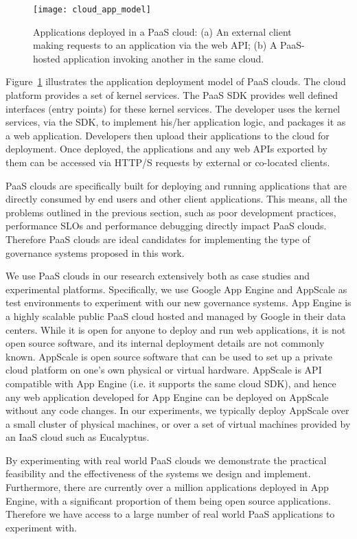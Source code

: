 \begin{figure}
\centering
\texttt{[image: cloud\_app\_model]}
\caption{Applications deployed in a PaaS cloud: (a) An external client making requests
to an application via the web API;
(b) A PaaS-hosted application invoking another in the same cloud.
\label{fig:cloud_app_model}
}
\end{figure}

Figure~\ref{fig:cloud_app_model} illustrates the application deployment model of PaaS clouds. 
The cloud platform provides a set of kernel services. 
The PaaS SDK provides well defined interfaces (entry points) for these kernel services.  
The developer uses the kernel services, via the SDK, to implement his/her application logic, and packages 
it as a web application. Developers then
upload their applications to the cloud for deployment.
Once deployed, the applications and any web APIs exported by them can be accessed 
via HTTP/S requests by external or co-located clients.

PaaS clouds are specifically built for deploying and running applications
that are directly consumed by end users and other client applications. This means, all the problems 
outlined in the previous section, such as poor development practices, performance SLOs and performance 
debugging directly impact PaaS clouds. Therefore PaaS clouds are ideal candidates for implementing the type
of governance systems proposed in this work. 

We use PaaS clouds in our research extensively both as case studies
and experimental platforms. Specifically, we use Google App Engine and AppScale as test environments
to experiment with our new governance systems. App Engine is a highly scalable public PaaS cloud hosted and
managed by Google in their data centers. While it is open for anyone to deploy and run web applications, it is not
open source software, and its internal deployment details are not commonly known. AppScale is open source
software that can be used to set up a private cloud platform on one's own physical or virtual hardware. AppScale
is API compatible with App Engine (i.e. it supports the same cloud SDK), and hence any web application developed
for App Engine can be deployed on AppScale without any code changes. In our experiments, we typically deploy
AppScale over a small cluster of physical machines, or over a set of virtual machines provided by an IaaS cloud
such as Eucalyptus.

By experimenting with real world PaaS clouds we demonstrate the practical feasibility and the effectiveness of 
the systems we design and implement. Furthermore, there are currently over a million applications deployed
in App Engine, with a significant proportion of them being open source applications. Therefore we have access
to a large number of real world PaaS applications to experiment with.

